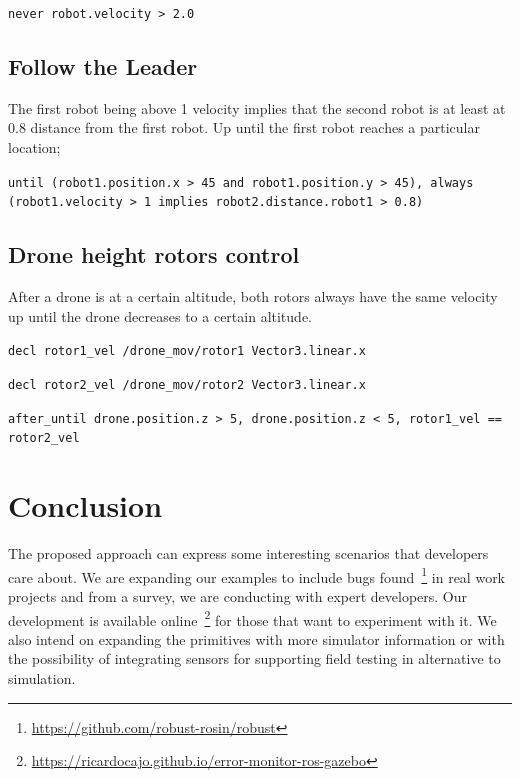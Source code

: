 \documentclass[runningheads]{llncs}
\begin{document}
\vspace{2mm}

\texttt{never robot.velocity > 2.0}

\subsection{Follow the Leader}

The first robot being above 1 velocity implies that the second robot is at least at 0.8 distance from the first robot. Up until the first robot reaches a particular location;

\vspace{2mm}

\texttt{until (robot1.position.x > 45 and robot1.position.y > 45), always (robot1.velocity > 1 implies robot2.distance.robot1 > 0.8)}


\subsection{Drone height rotors control}

After a drone is at a certain altitude, both rotors always have the same velocity up until the drone decreases to a certain altitude.

\vspace{2mm}

\texttt{decl rotor1\_vel /drone\_mov/rotor1 Vector3.linear.x}

\texttt{decl rotor2\_vel /drone\_mov/rotor2 Vector3.linear.x}

\vspace{2mm}

\texttt{after\_until drone.position.z > 5, drone.position.z < 5, rotor1\_vel == rotor2\_vel}


\section{Conclusion}

The proposed approach can express some interesting scenarios that developers care about. We are expanding our examples to include bugs found~\footnote{\url{https://github.com/robust-rosin/robust}} in real work projects and from a survey, we are conducting with expert developers. Our development is available online~\footnote{\url{https://ricardocajo.github.io/error-monitor-ros-gazebo}} for those that want to experiment with it. We also intend on expanding the primitives with more simulator information or with the possibility of integrating sensors for supporting field testing in alternative to simulation.




\end{document}
